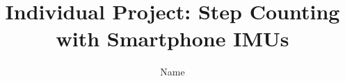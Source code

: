 \documentclass[sigconf, anonymous=false, review=true, 10pt]{acmart}
\def\sysname{\textsc{GPR}\xspace}
\begin{document}
\title[\sysname]{Individual Project: Step Counting with Smartphone IMUs}


\author{Name}




\renewcommand{\shortauthors}{\sysname}



\maketitle





% 
\end{document}
